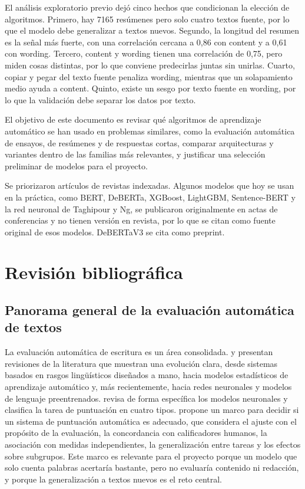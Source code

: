 \documentclass[11pt,a4paper]{article}
\begin{document}
El análisis exploratorio previo dejó cinco hechos que condicionan la elección de algoritmos. Primero, hay 7165 resúmenes pero solo cuatro textos fuente, por lo que el modelo debe generalizar a textos nuevos. Segundo, la longitud del resumen es la señal más fuerte, con una correlación cercana a 0,86 con content y a 0,61 con wording. Tercero, content y wording tienen una correlación de 0,75, pero miden cosas distintas, por lo que conviene predecirlas juntas sin unirlas. Cuarto, copiar y pegar del texto fuente penaliza wording, mientras que un solapamiento medio ayuda a content. Quinto, existe un sesgo por texto fuente en wording, por lo que la validación debe separar los datos por texto.

El objetivo de este documento es revisar qué algoritmos de aprendizaje automático se han usado en problemas similares, como la evaluación automática de ensayos, de resúmenes y de respuestas cortas, comparar arquitecturas y variantes dentro de las familias más relevantes, y justificar una selección preliminar de modelos para el proyecto.

Se priorizaron artículos de revistas indexadas. Algunos modelos que hoy se usan en la práctica, como BERT, DeBERTa, XGBoost, LightGBM, Sentence-BERT y la red neuronal de Taghipour y Ng, se publicaron originalmente en actas de conferencias y no tienen versión en revista, por lo que se citan como fuente original de esos modelos. DeBERTaV3 se cita como preprint.

\section{Revisión bibliográfica}

\subsection{Panorama general de la evaluación automática de textos}

La evaluación automática de escritura es un área consolidada. \citet{hussein2019} y \citet{ramesh2022} presentan revisiones de la literatura que muestran una evolución clara, desde sistemas basados en rasgos lingüísticos diseñados a mano, hacia modelos estadísticos de aprendizaje automático y, más recientemente, hacia redes neuronales y modelos de lenguaje preentrenados. \citet{uto2021} revisa de forma específica los modelos neuronales y clasifica la tarea de puntuación en cuatro tipos. \citet{williamson2012} propone un marco para decidir si un sistema de puntuación automática es adecuado, que considera el ajuste con el propósito de la evaluación, la concordancia con calificadores humanos, la asociación con medidas independientes, la generalización entre tareas y los efectos sobre subgrupos. Este marco es relevante para el proyecto porque un modelo que solo cuenta palabras acertaría bastante, pero no evaluaría contenido ni redacción, y porque la generalización a textos nuevos es el reto central.
\end{document}
